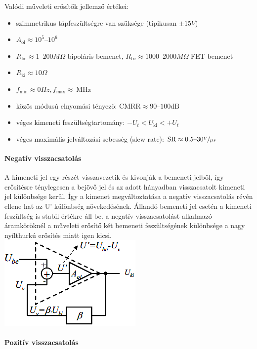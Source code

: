 Valódi műveleti erősítők jellemző értékei:
\begin{itemize}
	\item szimmetrikus tápfeszültségre van szüksége (tipikusan $\pm 15V$)
	\item $A_\text{ol} \approx 10^5 \text{--} 10^6$
	\item $R_\text{be} \approx 1 \text{--} 200 M\Omega$ bipoláris bemenet, $R_\text{be} \approx 1000 \text{--} 2000 M\Omega$ FET bemenet
	\item $R_\text{ki} \approx 10 \Omega$
	\item $f_\text{min} \approx 0 Hz, f_\text{max} \approx ~\text{MHz}$
	\item közös módusú elnyomási tényező: $\text{CMRR} \approx 90 \text{--} 100 \text{dB}$
	\item véges kimeneti feszültségtartomány: $-U_t < U_\text{ki} < +U_t$
	\item véges maximális jelváltozási sebesség (slew rate): $\text{SR} \approx 0.5 \text{--} 30 \nicefrac{V}{\mu s}$
\end{itemize}

\paragraph{Negatív visszacsatolás} A kimeneti jel egy részét visszavezetik és kivonják a bemeneti jelből, így erősítésre ténylegesen a bejövő jel és az adott hányadban visszacsatolt kimeneti jel különbsége kerül. Így a kimenet megváltoztatása a negatív visszacsatolás révén ellene hat az U’ különbség növekedésének. Állandó bemeneti jel esetén a kimeneti feszültség is stabil értékre áll be. a negatív visszacsatolást alkalmazó áramköröknél a műveleti erősítő két bemeneti feszültségének különbsége a nagy nyílthurkú erősítés miatt igen kicsi.\\
\includegraphics[width=0.5\linewidth]{fig/10-op_amp_neg_feedback}

\paragraph{Pozitív visszacsatolás}


